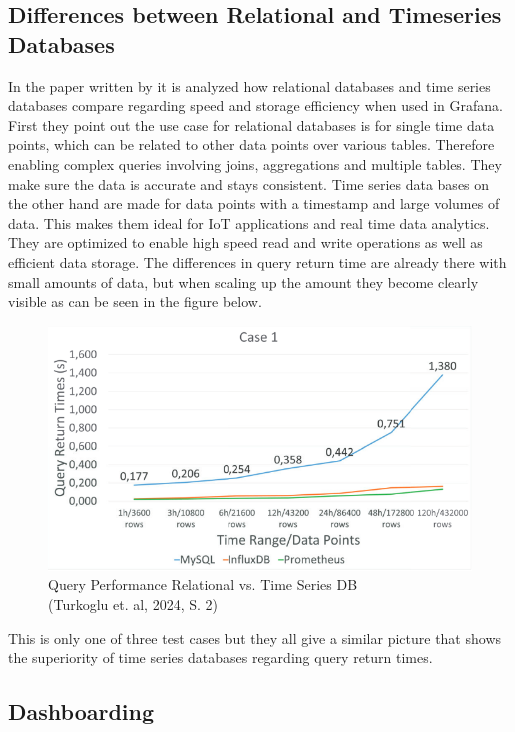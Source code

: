 \subsection{Differences between Relational and Timeseries Databases}
In the paper written by \cite{turkogluComparisonTimeSeries2024} it is analyzed how relational databases and time series databases compare regarding speed and storage efficiency when used in Grafana.
First they point out the use case for relational databases is for single time data points, which can be related to other data points over various tables. Therefore enabling complex queries involving joins, aggregations and multiple tables. They make sure the data is accurate and stays consistent.
Time series data bases on the other hand are made for data points with a timestamp and large volumes of data. This makes them ideal for IoT applications and real time data analytics. They are optimized to enable high speed read and write operations as well as efficient data storage.
The differences in query return time are already there with small amounts of data, but when scaling up the amount they become clearly visible as can be seen in the figure below.
\begin{figure}[H]
	\includegraphics[width=\linewidth]{pic/query-performance-db.png}
	\caption{Query Performance Relational vs. Time Series DB \\ (Turkoglu et. al, 2024, S. 2)}
	\label{fig:query-performance-db}
\end{figure}
This is only one of three test cases but they all give a similar picture that shows the superiority of time series databases regarding query return times.

\subsection{Dashboarding}


